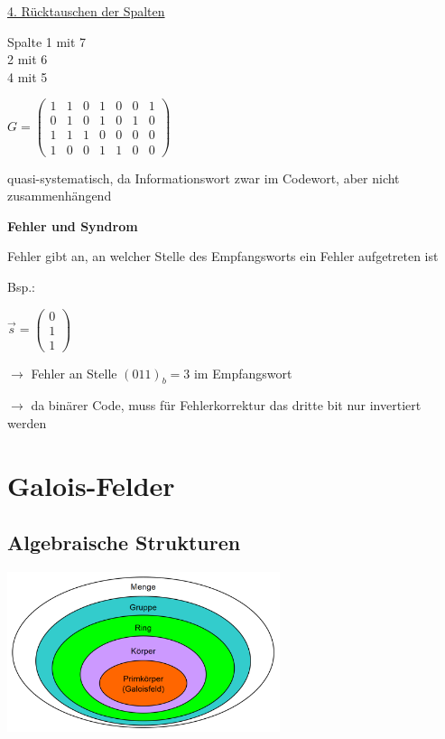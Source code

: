 \underline{4. Rücktauschen der Spalten}

Spalte 1 mit 7\\
2 mit 6\\
4 mit 5

$\displaystyle{
    G = \begin{pmatrix}
        1 & 1 & 0 & 1 & 0 & 0 & 1\\
        0 & 1 & 0 & 1 & 0 & 1 & 0\\
        1 & 1 & 1 & 0 & 0 & 0 & 0\\
        1 & 0 & 0 & 1 & 1 & 0 & 0
    \end{pmatrix}
}$

quasi-systematisch, da Informationswort zwar im Codewort, aber nicht zusammenhängend

\textbf{Fehler und Syndrom}

Fehler gibt an, an welcher Stelle des Empfangsworts ein Fehler aufgetreten ist

Bsp.:

$\displaystyle{
    \vec{s} = \begin{pmatrix}
        0\\
        1\\
        1
    \end{pmatrix}
}$

$\rightarrow$ Fehler an Stelle $(011)_b = 3$ im Empfangswort

$\rightarrow$ da binärer Code, muss für Fehlerkorrektur das dritte bit nur invertiert werden

\section{Galois-Felder}
\label{sec:galois}

\subsection{Algebraische Strukturen}

\includegraphics[width=8cm]{img/algebraische_strukturen.PNG}

